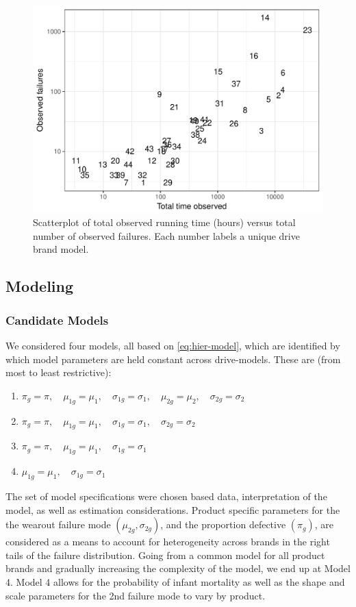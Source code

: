 \documentclass[12pt]{article}
\begin{document}
\begin{figure}[H]
  \includegraphics[width=.9\textwidth]{dm-summ-scatter.pdf}
  \caption{Scatterplot of total observed running time (hours) versus total number of observed failures.  Each number labels a unique drive brand model.}
  \label{fig1}
\end{figure}

\subsection{Modeling}
\subsubsection{Candidate Models}
We considered four models, all based on \ref{eq:hier-model}, which are identified by which model parameters are held constant across drive-models. These are (from most to least restrictive):

\begin{enumerate}
\item $\pi_{g} = \pi,\quad \mu_{1g} = \mu_1,\quad \sigma_{1g}=\sigma_1,\quad \mu_{2g} = \mu_2,\quad \sigma_{2g} = \sigma_2$
\item $\pi_{g} = \pi,\quad \mu_{1g} = \mu_1,\quad \sigma_{1g}=\sigma_1,\quad \sigma_{2g} = \sigma_2$
\item $\pi_{g} = \pi,\quad \mu_{1g} = \mu_1,\quad \sigma_{1g}=\sigma_1$
\item $\mu_{1g} = \mu_1,\quad \sigma_{1g}=\sigma_1$
\end{enumerate}

The set of model specifications were chosen based data, interpretation of the model, as well as estimation considerations.  Product specific parameters for the the wearout failure mode $(\mu_{2g},\sigma_{2g})$, and the proportion defective $(\pi_g)$, are considered as a means to account for heterogeneity across brands in the right tails of the failure distribution.  Going from a common model for all product brands and gradually increasing the complexity of the model, we end up at Model 4.  Model 4 allows for the probability of infant mortality as well as the shape and scale parameters for the 2nd failure mode to vary by product.
\end{document}
